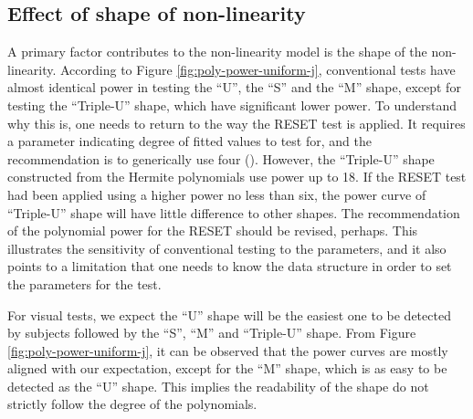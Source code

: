 \documentclass[]{interact}
\theoremstyle{plain}%
\theoremstyle{definition}
\theoremstyle{remark}
\begin{document}
\hypertarget{effect-of-shape-of-non-linearity}{%
\subsection{Effect of shape of
non-linearity}\label{effect-of-shape-of-non-linearity}}

A primary factor contributes to the non-linearity model is the shape of
the non-linearity. According to Figure \ref{fig:poly-power-uniform-j},
conventional tests have almost identical power in testing the ``U'', the
``S'' and the ``M'' shape, except for testing the ``Triple-U'' shape,
which have significant lower power. To understand why this is, one needs
to return to the way the RESET test is applied. It requires a parameter
indicating degree of fitted values to test for, and the recommendation
is to generically use four (\citet{ramsey_tests_1969}). However, the
``Triple-U'' shape constructed from the Hermite polynomials use power up
to 18. If the RESET test had been applied using a higher power no less
than six, the power curve of ``Triple-U'' shape will have little
difference to other shapes. The recommendation of the polynomial power
for the RESET should be revised, perhaps. This illustrates the
sensitivity of conventional testing to the parameters, and it also
points to a limitation that one needs to know the data structure in
order to set the parameters for the test.

For visual tests, we expect the ``U'' shape will be the easiest one to
be detected by subjects followed by the ``S'', ``M'' and ``Triple-U''
shape. From Figure \ref{fig:poly-power-uniform-j}, it can be observed
that the power curves are mostly aligned with our expectation, except
for the ``M'' shape, which is as easy to be detected as the ``U'' shape.
This implies the readability of the shape do not strictly follow the
degree of the polynomials.
\end{document}
